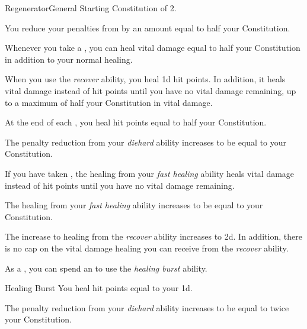     \begin{feat}{Regenerator}{General}
        \featpre Starting Constitution of 2.

         You reduce your penalties from  by an amount equal to half your Constitution.

         Whenever you take a , you can heal vital damage equal to half your Constitution in addition to your normal healing.

         When you use the \textit{recover} ability, you heal \plus1d hit points.
        In addition, it heals vital damage instead of hit points until you have no vital damage remaining, up to a maximum of half your Constitution in vital damage.

         At the end of each , you heal hit points equal to half your Constitution.

         The penalty reduction from your \textit{diehard} ability increases to be equal to your Constitution.

         If you have taken , the healing from your \textit{fast healing} ability heals vital damage instead of hit points until you have no vital damage remaining.

         The healing from your \textit{fast healing} ability increases to be equal to your Constitution.

         The increase to healing from the \textit{recover} ability increases to \plus2d.
        In addition, there is no cap on the vital damage healing you can receive from the \textit{recover} ability.

         As a , you can spend an  to use the \textit{healing burst} ability.
        \begin{ability}{Healing Burst}
            You heal hit points equal to your  \minus1d.
        \end{ability}

         The penalty reduction from your \textit{diehard} ability increases to be equal to twice your Constitution.
    \end{feat}

